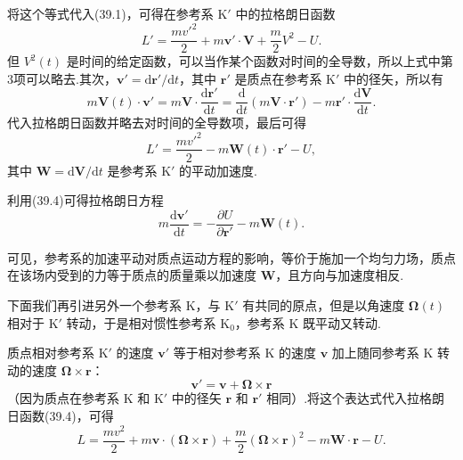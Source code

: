 将这个等式代入(39.1)，可得在参考系 $\mathrm{K}'$ 中的拉格朗日函数
\begin{equation*}
  L'=\frac{mv'^2}{2}+m\boldsymbol{v}'\cdot\boldsymbol{V}
  +\frac{m}{2}V^2-U.
\end{equation*}
但 $V^2(t)$ 是时间的给定函数，可以当作某个函数对时间的全导数，所以上式中第3项可以略去.其次，$\boldsymbol{v}'=\mathrm{d}\boldsymbol{r}'/\mathrm{d}t$，其中 $\boldsymbol{r}'$ 是质点在参考系 $\mathrm{K}'$ 中的径矢，所以有
\begin{equation*}
  m\boldsymbol{V}(t)\cdot\boldsymbol{v}'
  =m\boldsymbol{V}\cdot\frac{\mathrm{d}\boldsymbol{r}'}{\mathrm{d}t}
  =\frac{\mathrm{d}}{\mathrm{d}t}\left(m\boldsymbol{V}\cdot\boldsymbol{r}'\right)
  -m\boldsymbol{r}'\cdot\frac{\mathrm{d}\boldsymbol{V}}{\mathrm{d}t}.
\end{equation*}
代入拉格朗日函数并略去对时间的全导数项，最后可得
\begin{equation}
  L'=\frac{mv'^2}{2}-m\boldsymbol{W}(t)\cdot\boldsymbol{r}'-U,
\end{equation}
其中 $\boldsymbol{W}=\mathrm{d}\boldsymbol{V}/\mathrm{d}t$ 是参考系 $\mathrm{K}'$ 的平动加速度.

利用(39.4)可得拉格朗日方程
\begin{equation}
  m\frac{\mathrm{d}\boldsymbol{v}'}{\mathrm{d}t}
  =-\frac{\partial U}{\partial\boldsymbol{r}'}
  -m\boldsymbol{W}(t).
\end{equation}

可见，参考系的加速平动对质点运动方程的影响，等价于施加一个均匀力场，质点在该场内受到的力等于质点的质量乘以加速度 $\boldsymbol{W}$，且方向与加速度相反.

下面我们再引进另外一个参考系 $\mathrm{K}$，与 $\mathrm{K}'$ 有共同的原点，但是以角速度 $\boldsymbol{\Omega}(t)$ 相对于 $\mathrm{K}'$ 转动，于是相对惯性参考系 $\mathrm{K}_0$，参考系 $\mathrm{K}$ 既平动又转动.

质点相对参考系 $\mathrm{K}'$ 的速度 $\boldsymbol{v}'$ 等于相对参考系 $\mathrm{K}$ 的速度 $\boldsymbol{v}$ 加上随同参考系 $\mathrm{K}$ 转动的速度
$\boldsymbol{\Omega}\times\boldsymbol{r}$：
\begin{equation*}
  \boldsymbol{v}'=\boldsymbol{v}
  +\boldsymbol{\Omega}\times\boldsymbol{r}
\end{equation*}
（因为质点在参考系 $\mathrm{K}$ 和 $\mathrm{K}'$ 中的径矢 $\boldsymbol{r}$ 和 $\boldsymbol{r}'$ 相同）.将这个表达式代入拉格朗日函数(39.4)，可得
\begin{equation}
  L=\frac{mv^2}{2}
  +m\boldsymbol{v}\cdot(\boldsymbol{\Omega}\times\boldsymbol{r})
  +\frac{m}{2}(\boldsymbol{\Omega}\times\boldsymbol{r})^2
  -m\boldsymbol{W}\cdot\boldsymbol{r}-U.
\end{equation}

